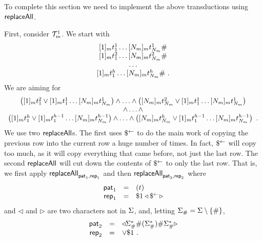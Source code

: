 To complete this section we need to implement the above transductions using
$\mathsf{replaceAll}$.

First, consider $\mathcal{T}^1_m$.  We start with
\[
    \begin{array}{c}
        \fullrow{1} \spacer \\
        \fullrow{2} \spacer \\
        \ldots \\
        \fullrow{\tileheight} \spacer \ .
    \end{array}
\]
We are aiming for
\[
    \begin{array}{c}
        \left(
            [1]_{m} t^2_1
                \lor
                [1]_{m} t^{1}_1 \ldots [N_{m}]_{m} t^{1}_{N_{m}}
        \right)
        \land
        \ldots
        \land
        \left(
            [N_{m}]_{m} t^2_{N_{m}}
                \lor
                [1]_{m} t^{1}_1 \ldots [N_{m}]_{m} t^{1}_{N_{m}}
        \right) \\
        \land \ldots \land \\
        \left(
            [1]_{m} t^h_1
                \lor
                [1]_{m} t^{h-1}_1 \ldots [N_{m}]_{m} t^{h-1}_{N_{m}}
        \right)
        \land
        \ldots
        \land
        \left(
            [N_{m}]_{m}
                t^h_{N_{m}}
                \lor
                [1]_{m} t^{h-1}_1 \ldots [N_{m}]_{m} t^{h-1}_{N_{m}}
        \right) \ .\\
    \end{array}
\]
We use two $\mathsf{replaceAll}$s. The first uses $\$^{\leftarrow}$ to do the main work of
copying the previous row into the current row a huge number of times. In fact,
$\$^{\leftarrow}$ will copy too much, as it will copy everything that came before,
not just the last row. The second $\mathsf{replaceAll}$ will cut down the contents of
$\$^{\leftarrow}$ to only the last row. That is, we first apply
$\mathsf{replaceAll}_{\mathsf{pat}_1, \mathsf{rep}_1}$ and then $\mathsf{replaceAll}_{\mathsf{pat}_2, \mathsf{rep}_2}$ where
\[
    \begin{array}{rcl}
        \mathsf{pat}_1 &=& (t) \\
        \mathsf{rep}_1 &=& \$1 \triangleleft \$^{\leftarrow} \triangleright
    \end{array}
\]
and $\triangleleft$ and $\triangleright$ are two characters not in $\Sigma$,
and, letting $\Sigma_\# = \Sigma \setminus \{ \# \}$,
\[
    \begin{array}{rcl}
        \mathsf{pat}_2 &=& \triangleleft
                \Sigma_\#^\ast \# (
                    \Sigma_\#^\ast
                ) \# \Sigma_\#^\ast
            \triangleright \\
        \mathsf{rep}_2 &=& \lor \$1 \ .
    \end{array}
\]
